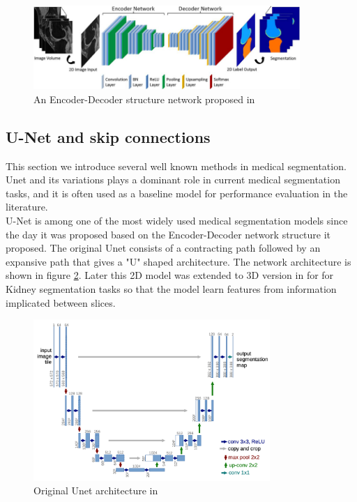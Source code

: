 \begin{figure}
\centering
\includegraphics[width = 0.9\textwidth]{img/background_img/segnet_background}
\caption{An Encoder-Decoder structure network proposed in \cite{Liu2018DeepCN}}
\label{fig:segnet_encoderdecoder}
\end{figure}


\subsection{U-Net and skip connections}
This section we introduce several well known methods in medical segmentation. Unet \cite{ronneberger_u-net_2015} and its variations plays a dominant role in current medical segmentation tasks, and it is often used as a baseline model for performance evaluation in the literature.\\

U-Net \cite{ronneberger_u-net_2015} is among one of the most widely used medical segmentation models since the day it was proposed based on the Encoder-Decoder network structure it proposed. The original Unet consists of a contracting path followed by an expansive path that gives a "U" shaped architecture. The network architecture is shown in figure \ref{fig:unet-arch}.
Later this 2D model was extended to 3D version in \cite{ourselin_3d_2016} for for Kidney segmentation tasks so that the model learn features from information implicated between slices.\\
\begin{figure}
\centering
\includegraphics[width = 0.8\textwidth]{img/Unet_architecture}
\caption{Original Unet architecture in \cite{ronneberger_u-net_2015}}
\label{fig:unet-arch}
\end{figure}

